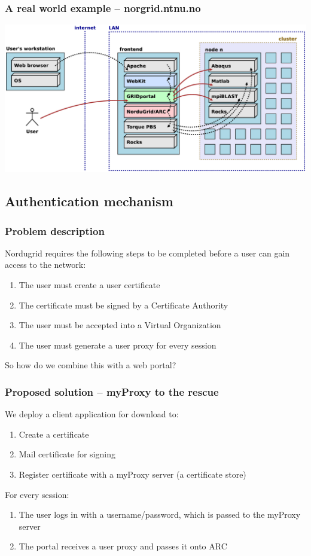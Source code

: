 \documentclass{beamer}
\begin{document}
\begin{frame}
  \frametitle{A real world example -- norgrid.ntnu.no}

	\begin{center}
		\includegraphics[width=1.0\textwidth]{physical.eps}
	\end{center}	
\end{frame}




\subsection{Authentication mechanism}


\begin{frame}
  \frametitle{Problem description}

	Nordugrid requires the following steps to be completed before a user can gain access to the network:
  \begin{enumerate}
  	\item The user must create a user certificate
	  \item The certificate must be signed by a Certificate Authority
	  \item The user must be accepted into a Virtual Organization
	  \item The user must generate a user proxy for every session
  \end{enumerate}
  \bigskip
  
  So how do we combine this with a web portal?
\end{frame}


\begin{frame}
  \frametitle{Proposed solution -- myProxy to the rescue}

	We deploy a client application for download to:
  \begin{enumerate}
  	\item Create a certificate
	  \item Mail certificate for signing
	  \item Register certificate with a myProxy server (a certificate store)
  \end{enumerate}
  \bigskip
  
  For every session: 
  \begin{enumerate}
  	\item The user logs in with a username/password, which is passed to the myProxy server
	  \item The portal receives a user proxy and passes it onto ARC
  \end{enumerate}
\end{frame}
\end{document}
